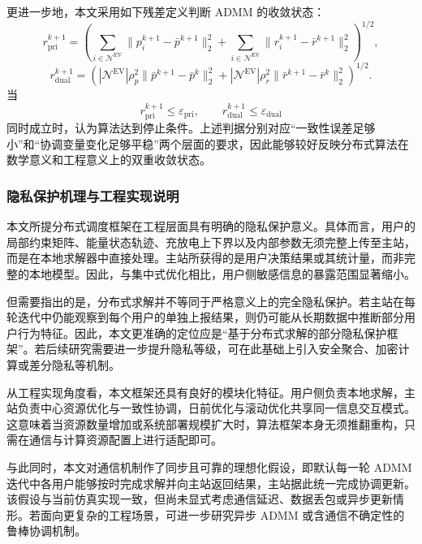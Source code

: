 更进一步地，本文采用如下残差定义判断 ADMM 的收敛状态：
\begin{equation}
r_{\mathrm{pri}}^{k+1} = \left(
\sum_{i \in \mathcal{N}^{\mathrm{EV}}} \|p_i^{k+1} - \bar p^{k+1}\|_2^2
+ \sum_{i \in \mathcal{N}^{\mathrm{EV}}} \|r_i^{k+1} - \bar r^{k+1}\|_2^2
\right)^{1/2},
\end{equation}
\begin{equation}
r_{\mathrm{dual}}^{k+1} = \left(
|\mathcal{N}^{\mathrm{EV}}| \rho_p^2 \|\bar p^{k+1} - \bar p^k\|_2^2
+ |\mathcal{N}^{\mathrm{EV}}| \rho_r^2 \|\bar r^{k+1} - \bar r^k\|_2^2
\right)^{1/2}.
\end{equation}
当
\begin{equation}
r_{\mathrm{pri}}^{k+1} \le \varepsilon_{\mathrm{pri}}, \qquad r_{\mathrm{dual}}^{k+1} \le \varepsilon_{\mathrm{dual}}
\end{equation}
同时成立时，认为算法达到停止条件。上述判据分别对应“一致性误差足够小”和“协调变量变化足够平稳”两个层面的要求，因此能够较好反映分布式算法在数学意义和工程意义上的双重收敛状态。

\subsubsection{隐私保护机理与工程实现说明}
\label{subsubsec:vpp_admm_model_algorithm_privacy}

本文所提分布式调度框架在工程层面具有明确的隐私保护意义。具体而言，用户的局部约束矩阵、能量状态轨迹、充放电上下界以及内部参数无须完整上传至主站，而是在本地求解器中直接处理。主站所获得的是用户决策结果或其统计量，而非完整的本地模型。因此，与集中式优化相比，用户侧敏感信息的暴露范围显著缩小。

但需要指出的是，分布式求解并不等同于严格意义上的完全隐私保护。若主站在每轮迭代中仍能观察到每个用户的单独上报结果，则仍可能从长期数据中推断部分用户行为特征。因此，本文更准确的定位应是“基于分布式求解的部分隐私保护框架”。若后续研究需要进一步提升隐私等级，可在此基础上引入安全聚合、加密计算或差分隐私等机制。

从工程实现角度看，本文框架还具有良好的模块化特征。用户侧负责本地求解，主站负责中心资源优化与一致性协调，日前优化与滚动优化共享同一信息交互模式。这意味着当资源数量增加或系统部署规模扩大时，算法框架本身无须推翻重构，只需在通信与计算资源配置上进行适配即可。

与此同时，本文对通信机制作了同步且可靠的理想化假设，即默认每一轮 ADMM 迭代中各用户能够按时完成求解并向主站返回结果，主站据此统一完成协调更新。该假设与当前仿真实现一致，但尚未显式考虑通信延迟、数据丢包或异步更新情形。若面向更复杂的工程场景，可进一步研究异步 ADMM 或含通信不确定性的鲁棒协调机制。

